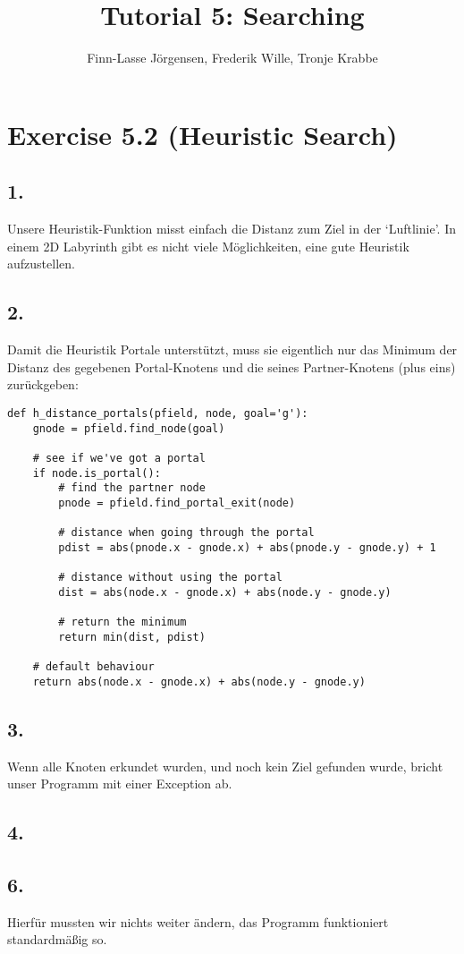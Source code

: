\documentclass[12pt,a4paper]{article}
\author{Finn-Lasse Jörgensen, Frederik Wille, Tronje Krabbe}
\title{Tutorial 5: Searching}
\begin{document}
\maketitle


\section*{Exercise 5.2 (Heuristic Search)}
\subsection*{1.}
Unsere Heuristik-Funktion misst einfach die Distanz zum Ziel in der `Luftlinie'.
In einem 2D Labyrinth gibt es nicht viele Möglichkeiten, eine gute Heuristik aufzustellen.

\subsection*{2.}
Damit die Heuristik Portale unterstützt, muss sie eigentlich nur das Minimum der Distanz
des gegebenen Portal-Knotens und die seines Partner-Knotens (plus eins) zurückgeben:

\begin{verbatim}
def h_distance_portals(pfield, node, goal='g'):
    gnode = pfield.find_node(goal)

    # see if we've got a portal
    if node.is_portal():
        # find the partner node
        pnode = pfield.find_portal_exit(node)

        # distance when going through the portal
        pdist = abs(pnode.x - gnode.x) + abs(pnode.y - gnode.y) + 1 

        # distance without using the portal
        dist = abs(node.x - gnode.x) + abs(node.y - gnode.y)

        # return the minimum
        return min(dist, pdist)

    # default behaviour
    return abs(node.x - gnode.x) + abs(node.y - gnode.y)
\end{verbatim}

\subsection*{3.}
Wenn alle Knoten erkundet wurden, und noch kein Ziel gefunden wurde, bricht unser Programm mit einer Exception ab.

\subsection*{4.}

\subsection*{6.}
Hierfür mussten wir nichts weiter ändern, das Programm funktioniert standardmäßig so.
\end{document}
